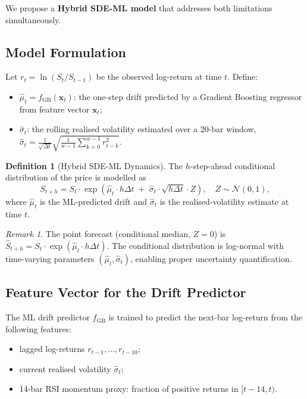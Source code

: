 \documentclass[12pt, a4paper, oneside]{report}
\theoremstyle{plain}
\theoremstyle{definition}
\newtheorem{definition}[theorem]{Definition}
\theoremstyle{remark}
\newtheorem{remark}[theorem]{Remark}
\begin{document}
We propose a \textbf{Hybrid SDE-ML model} that addresses both limitations
simultaneously.

\subsection{Model Formulation}

Let $r_t = \ln(S_t / S_{t-1})$ be the observed log-return at time $t$.  Define:
\begin{itemize}[leftmargin=1.25cm]
  \item $\hat\mu_t = f_{\text{GB}}(\mathbf{x}_t)$: the one-step drift predicted
    by a Gradient Boosting regressor from feature vector $\mathbf{x}_t$;
  \item $\hat\sigma_t$: the rolling realised volatility estimated over a 20-bar
    window, $\hat\sigma_t = \frac{1}{\sqrt{\Delta t}}\sqrt{\frac{1}{w-1}\sum_{k=0}^{w-1}r_{t-k}^2}$.
\end{itemize}

\begin{definition}[Hybrid SDE-ML Dynamics]
\label{def:hybrid}
The $h$-step-ahead conditional distribution of the price is modelled as
\begin{equation}
\label{eq:hybrid}
  S_{t+h} = S_t \cdot \exp\!\left(
    \hat\mu_t \cdot h\Delta t
    \;+\; \hat\sigma_t \cdot \sqrt{h\Delta t} \cdot Z
  \right), \quad Z \sim \mathcal{N}(0,1),
\end{equation}
where $\hat\mu_t$ is the ML-predicted drift and $\hat\sigma_t$ is the
realised-volatility estimate at time $t$.
\end{definition}

\begin{remark}
The point forecast (conditional median, $Z = 0$) is
$\hat S_{t+h} = S_t \cdot \exp(\hat\mu_t \cdot h\Delta t)$.
The conditional distribution is log-normal with time-varying parameters
$(\hat\mu_t, \hat\sigma_t)$, enabling proper uncertainty quantification.
\end{remark}

\subsection{Feature Vector for the Drift Predictor}

The ML drift predictor $f_{\text{GB}}$ is trained to predict the next-bar
log-return from the following features:
\begin{itemize}[leftmargin=1.25cm]
  \item lagged log-returns $r_{t-1}, \ldots, r_{t-10}$;
  \item current realised volatility $\hat\sigma_t$;
  \item 14-bar RSI momentum proxy: fraction of positive returns in $[t-14, t)$.
\end{itemize}
\end{document}
